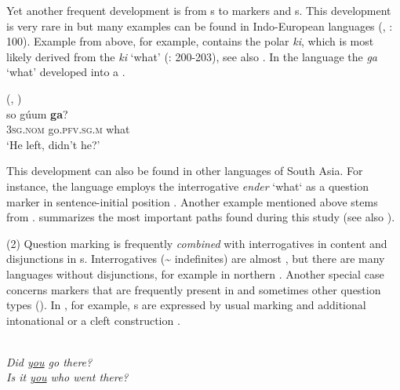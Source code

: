 Yet another frequent development is from s to  markers and s. This development is very rare in  but many examples can be found in Indo-European languages (, \citealt{Hackstein2013}: 100). Example  from  above, for example, contains the polar  \textit{ki}, which is most likely derived from the  \textit{ki} ‘what’ (\citealt{Thompson2012}: 200-203), see also . In the language  the  \textit{ga} ‘what’ developed into a  .

\ea%
    \label{ex:4:32}
     (, )\\
    \gll so gúum \textbf{{ga}}?\\
    3\textsc{sg.nom}  go.\textsc{pfv}.\textsc{sg.}\textsc{m}  what\\
    \glt ‘He left, didn’t he?’ \citep[404]{Liljegren2016}
    \z

\noindent This development can also be found in other languages of South Asia. For instance, the  language  employs the interrogative \textit{ender} ‘what‘ as a question marker in sentence-initial position \citep[241-242]{Kobayashi2017}. Another example mentioned above stems from .  summarizes the most important  paths found during this study (see also \citealt{Bencini2003}).

        (2) Question marking is frequently \textit{combined} with interrogatives in content  and disjunctions in s. Interrogatives ({\textasciitilde} indefinites) are almost , but there are many languages without disjunctions, for example in northern . Another special case concerns  markers that are frequently present in  and sometimes other question types (). In , for example, s are expressed by usual  marking and additional intonational  or a cleft construction .

\ea%
    \label{ex:4:33}
    \\
    \ea
      \textit{Did \uline{you} go there?}\\
    
    \ex
      \textit{Is it \uline{you} who went there?}\\
    \z
    \z

